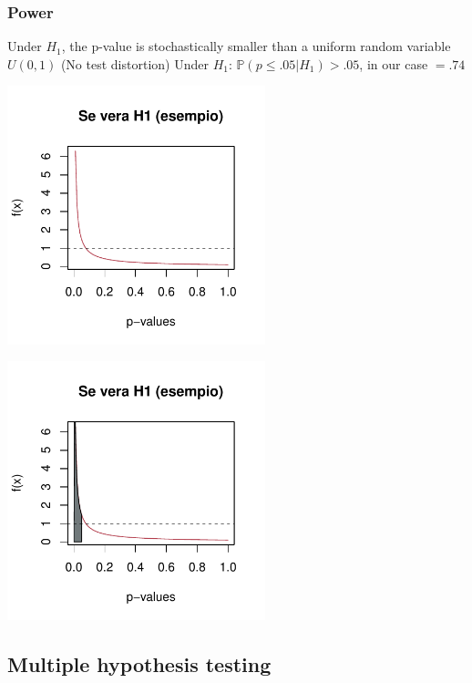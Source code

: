 \documentclass[xcolor={dvipsnames}]{beamer}
\newcommand{\rbf}[1]{\textcolor{redUnipd}{ #1}}
\begin{document}
\begin{frame}
\frametitle{Power}


\begin{overprint}
 {Under $H_1$, the p-value is \rbf{stochastically smaller} than a uniform random variable $U(0,1)$ (No test distortion)}
 {Under $H_1$: $\mathbb{P}(p\leq .05 |H_1)>.05$, in our case $= .74$\\ }
\end{overprint}
\begin{overprint} 
 \centerline{\includegraphics[width=7.5cm]{plaatjes/beta1}}
 \centerline{\includegraphics[width=7.5cm]{plaatjes/beta2}}
\end{overprint} 
\end{frame}

\subsection{Multiple hypothesis testing}
\end{document}
